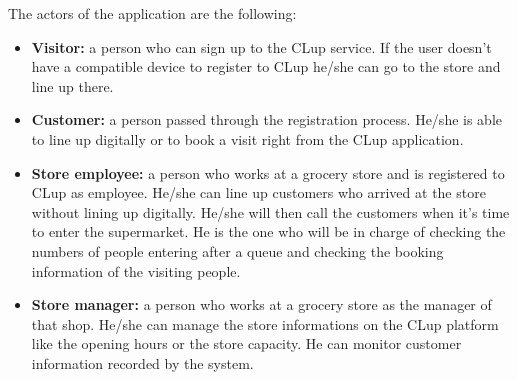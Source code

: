 The actors of the application are the following:
\begin{itemize}
    \item \textbf{Visitor:} a person who can sign up to the CLup service. If the user doesn't have a compatible device to register to CLup he/she can go to the store and line up there.
    \item \textbf{Customer:} a person passed through the registration process. He/she is able to line up digitally or to book a visit right from the CLup application.
    \item \textbf{Store employee:} a person who works at a grocery store and is registered to CLup as employee. He/she can line up customers who arrived at the store without lining up digitally. He/she will then call the customers when it's time to enter the supermarket. He is the one who will be in charge of checking the numbers of people entering after a queue and checking the booking information of the visiting people.
    \item \textbf{Store manager:} a person who works at a grocery store as the manager of that shop. He/she can manage the store informations on the CLup platform like the opening hours or the store capacity. He can monitor customer information recorded by the system.
\end{itemize}